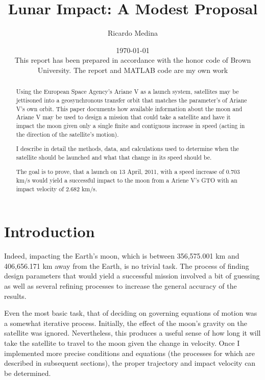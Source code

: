 \documentclass{article}
\begin{document}
\title{Lunar Impact: A Modest Proposal}
\author{Ricardo Medina}
\date{\today \\ 
\bigskip
This report has been prepared in accordance with the honor code of
Brown University.
The report and MATLAB code are my own work}

\maketitle
\thispagestyle{empty}
\pagebreak

\tableofcontents

\pagebreak

\begin{abstract}
  Using the European Space Agency's Ariane V as a launch system,
  satellites may be jettisoned into a geosynchronous transfer orbit
  that matches the parameter's of Ariane V's own orbit.
  This paper documents how available
  information about the moon and Ariane V may be used to design a
  mission that could take a satellite and have it impact the moon
  given only a single finite and contiguous increase in speed (acting
  in the direction of the satellite's motion).
  
  I describe in detail the methods, data, and calculations used
  to determine when the satellite should be launched and what that
  change in its speed should be.

  The goal is to prove, that a launch on 13 April, 2011, with a speed
  increase of 0.703 km/s would yield a successful impact to the moon
  from a Ariene V's GTO with an impact velocity of 2.682 km/s.
\end{abstract}

\section{Introduction}
Indeed, impacting the Earth's moon, which is between 356,575.001 km and
406,656.171 km away from the Earth, is no trivial task. The process of
finding design parameters that would yield a successful mission
involved a bit of guessing as well as several refining processes to
increase the general accuracy of the results.

Even the most basic task, that of deciding on governing equations of
motion was a somewhat iterative process.
Initially, the effect of the moon's gravity on the satellite was
ignored. Nevertheless, this produces a useful sense of how long it
will take the satellite to travel to the moon given the change in
velocity. Once I implemented more precise conditions and equations
(the processes for which are described in subsequent sections),
the proper trajectory and impact velocity can be determined.
\end{document}
